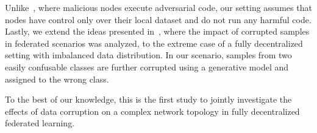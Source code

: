 Unlike~\cite{gentz2015detection}, where malicious nodes execute adversarial code, our setting assumes that nodes have control only over their local dataset and do not run any harmful code. Lastly, we extend the ideas presented in~\cite{cao2019understanding}, where the impact of corrupted samples in federated scenarios was analyzed, to the extreme case of a fully decentralized setting with imbalanced data distribution. In our scenario, samples from two easily confusable classes are further corrupted using a generative model and assigned to the wrong class.

To the best of our knowledge, this is the first study to jointly investigate the effects of data corruption on a complex network topology in fully decentralized federated learning.
